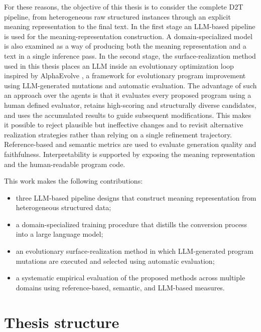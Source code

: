 For these reasons, the objective of this thesis is to consider the complete D2T pipeline, from heterogeneous
raw structured instances through an explicit meaning representation to the final
text.
In the first stage an
LLM-based pipeline is used for the meaning-representation construction. A domain-specialized
model is also examined as a way of producing both the meaning representation and a text in a single inference pass.
In the second stage, the surface-realization method used in this thesis places an
LLM inside an evolutionary optimization loop inspired by AlphaEvolve
\cite{novikov2025alphaevolve}, a framework for evolutionary program improvement
using LLM-generated mutations and automatic evaluation.
The advantage of such an approach over the agents is that it evaluates every proposed program using a
human defined evaluator, retains high-scoring and structurally diverse candidates, and uses
the accumulated results to guide subsequent modifications. This makes it
possible to reject plausible but ineffective changes and to revisit alternative
realization strategies rather than relying on a single refinement trajectory.
Reference-based and semantic metrics are used to evaluate generation quality and faithfulness.
Interpretability is supported by exposing the meaning representation and the human-readable program code.

This work makes the following contributions:
\begin{itemize}
    \item three LLM-based pipeline designs that construct meaning representation
    from heterogeneous structured data;
    \item a domain-specialized training procedure that distills the
    conversion process into a large language model;
    \item an evolutionary surface-realization method in which LLM-generated
    program mutations are executed and selected using automatic evaluation;
    \item a systematic empirical evaluation of the proposed methods across
    multiple domains using reference-based, semantic, and LLM-based measures.
\end{itemize}

\section{Thesis structure}

